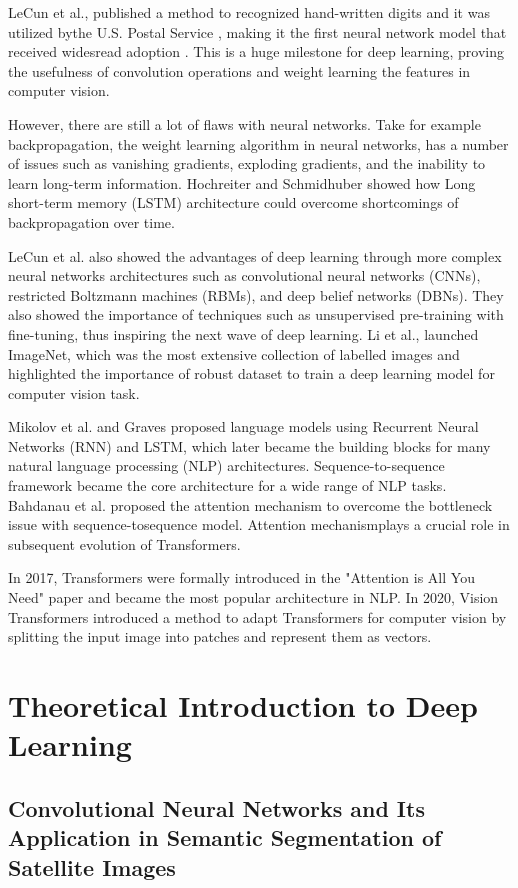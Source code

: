 LeCun et al., published a method to recognized hand-written digits and it was utilized bythe U.S. Postal Service \cite{LeCunBoserDenkerEtAl89}, making it the first neural network model that received widesread adoption . This is a huge milestone for deep learning, proving the usefulness of convolution operations and weight learning the features in computer vision.

However, there are still a lot of flaws with neural networks. Take for example backpropagation, the weight learning algorithm in neural networks, has a number of issues such as vanishing gradients, exploding gradients, and the inability to learn long-term information. Hochreiter and Schmidhuber showed how  Long short-term memory (LSTM) architecture could overcome shortcomings of backpropagation over time.

LeCun et al. also showed the advantages of deep learning through more complex neural networks architectures such as convolutional neural networks (CNNs), restricted Boltzmann machines (RBMs), and deep belief networks (DBNs). They also showed the importance of techniques such as unsupervised pre-training
with fine-tuning, thus inspiring the next wave of deep learning. Li et al.,  launched ImageNet, which was the most extensive collection of labelled images and highlighted the importance of robust dataset to train a deep learning model for computer vision task. 

Mikolov et al. and Graves proposed language models using Recurrent Neural Networks (RNN) and LSTM, which later became the building blocks for many natural language processing (NLP) architectures. Sequence-to-sequence framework became the core architecture for a wide range of NLP tasks. Bahdanau et al. proposed the attention mechanism to overcome the bottleneck issue with sequence-tosequence model. Attention mechanismplays a crucial role in subsequent evolution of Transformers.

In 2017, Transformers were formally introduced in the "Attention is All You Need" paper \cite{attention-is-all-you-need} and became the most popular architecture in NLP. In 2020, Vision Transformers \cite{16x16} introduced a method to adapt Transformers for computer vision by splitting the input image into patches and represent them as vectors.


\section{Theoretical Introduction to Deep Learning}
\subsection{Convolutional Neural Networks and Its Application in Semantic Segmentation of Satellite Images}

